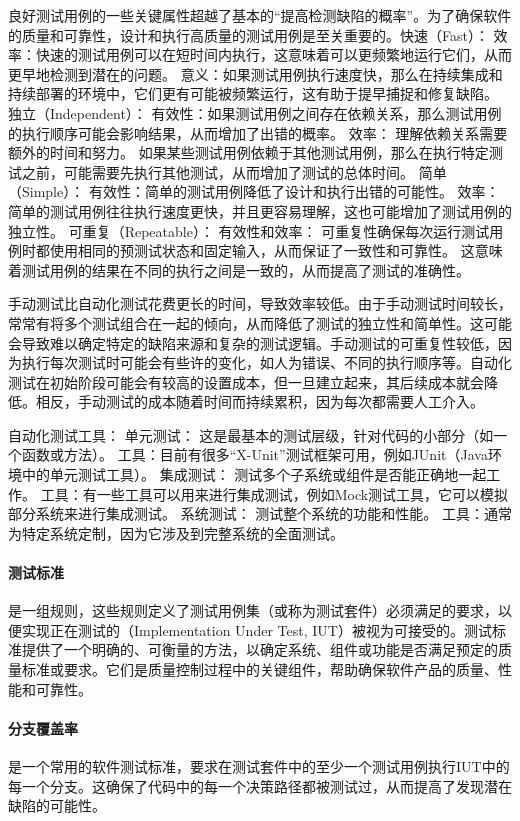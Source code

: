 \documentclass[]{ctexbook}
\begin{document}
良好测试用例的一些关键属性超越了基本的“提高检测缺陷的概率”。为了确保软件的质量和可靠性，设计和执行高质量的测试用例是至关重要的。快速（Fast）：
效率：快速的测试用例可以在短时间内执行，这意味着可以更频繁地运行它们，从而更早地检测到潜在的问题。
意义：如果测试用例执行速度快，那么在持续集成和持续部署的环境中，它们更有可能被频繁运行，这有助于提早捕捉和修复缺陷。
独立（Independent）：
有效性：如果测试用例之间存在依赖关系，那么测试用例的执行顺序可能会影响结果，从而增加了出错的概率。
效率：
理解依赖关系需要额外的时间和努力。
如果某些测试用例依赖于其他测试用例，那么在执行特定测试之前，可能需要先执行其他测试，从而增加了测试的总体时间。
简单（Simple）：
有效性：简单的测试用例降低了设计和执行出错的可能性。
效率：简单的测试用例往往执行速度更快，并且更容易理解，这也可能增加了测试用例的独立性。
可重复（Repeatable）：
有效性和效率：
可重复性确保每次运行测试用例时都使用相同的预测试状态和固定输入，从而保证了一致性和可靠性。
这意味着测试用例的结果在不同的执行之间是一致的，从而提高了测试的准确性。

手动测试比自动化测试花费更长的时间，导致效率较低。由于手动测试时间较长，常常有将多个测试组合在一起的倾向，从而降低了测试的独立性和简单性。这可能会导致难以确定特定的缺陷来源和复杂的测试逻辑。手动测试的可重复性较低，因为执行每次测试时可能会有些许的变化，如人为错误、不同的执行顺序等。自动化测试在初始阶段可能会有较高的设置成本，但一旦建立起来，其后续成本就会降低。相反，手动测试的成本随着时间而持续累积，因为每次都需要人工介入。

自动化测试工具：
单元测试：
这是最基本的测试层级，针对代码的小部分（如一个函数或方法）。
工具：目前有很多“X-Unit”测试框架可用，例如JUnit（Java环境中的单元测试工具）。
集成测试：
测试多个子系统或组件是否能正确地一起工作。
工具：有一些工具可以用来进行集成测试，例如Mock测试工具，它可以模拟部分系统来进行集成测试。
系统测试：
测试整个系统的功能和性能。
工具：通常为特定系统定制，因为它涉及到完整系统的全面测试。

\paragraph{测试标准}是一组规则，这些规则定义了测试用例集（或称为测试套件）必须满足的要求，以便实现正在测试的（Implementation Under Test, IUT）被视为可接受的。测试标准提供了一个明确的、可衡量的方法，以确定系统、组件或功能是否满足预定的质量标准或要求。它们是质量控制过程中的关键组件，帮助确保软件产品的质量、性能和可靠性。

\paragraph{分支覆盖率}是一个常用的软件测试标准，要求在测试套件中的至少一个测试用例执行IUT中的每一个分支。这确保了代码中的每一个决策路径都被测试过，从而提高了发现潜在缺陷的可能性。
\end{document}
